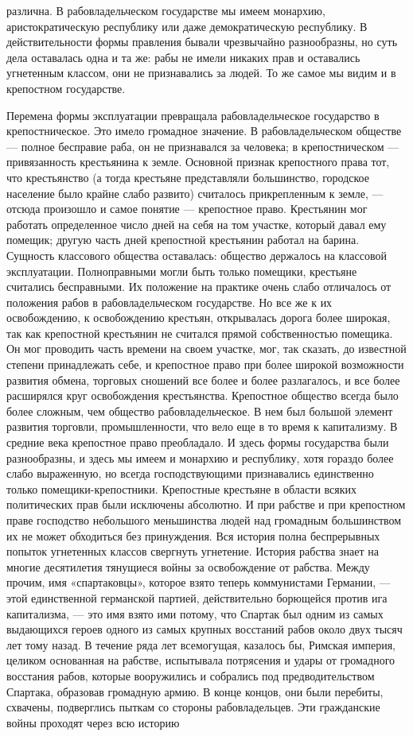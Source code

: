 \documentclass[12pt]{article}
\newcommand{\parnum}{(\arabic{parcount})}
\newcounter{parcount}
\newenvironment{parnumbers}{%
  \par%
  \everypar{\noindent \stepcounter{parcount}\marginpar[]{\parnum}}%
}{}
\begin{document}
\begin{parnumbers}
различна. В рабовладельческом государстве мы имеем монархию, аристократическую республику или даже демократическую республику. В действительности формы правления бывали чрезвычайно разнообразны, но суть дела оставалась одна и та же: рабы не имели никаких прав и оставались угнетенным классом, они не признавались за людей. То же самое мы видим и в крепостном государстве.

Перемена формы эксплуатации превращала рабовладельческое государство в крепостническое. Это имело громадное значение. В рабовладельческом обществе — полное бесправие раба, он не признавался за человека; в крепостническом — привязанность крестьянина к земле. Основной признак крепостного права тот, что крестьянство (а тогда крестьяне представляли большинство, городское население было крайне слабо развито) считалось прикрепленным к земле, — отсюда произошло и самое понятие — крепостное право. Крестьянин мог работать определенное число дней на себя на том участке, который давал ему помещик; другую часть дней крепостной крестьянин работал на барина. Сущность классового общества оставалась: общество держалось на классовой эксплуатации. Полноправными могли быть только помещики, крестьяне считались бесправными. Их положение на практике очень слабо отличалось от положения рабов в рабовладельческом государстве. Но все же к их освобождению, к освобождению крестьян, открывалась дорога более широкая, так как крепостной крестьянин не считался прямой собственностью помещика. Он мог проводить часть времени на своем участке, мог, так сказать, до известной степени принадлежать себе, и крепостное право при более широкой возможности развития обмена, торговых сношений все более и более разлагалось, и все более расширялся круг освобождения крестьянства. Крепостное общество всегда было более сложным, чем общество рабовладельческое. В нем был большой элемент развития торговли, промышленности, что вело еще в то время к капитализму. В средние века крепостное право преобладало. И здесь формы государства были разнообразны, и здесь мы имеем и монархию и республику, хотя гораздо более слабо выраженную, но всегда господствующими признавались единственно только помещики-крепостники. Крепостные крестьяне в области всяких политических прав были исключены абсолютно. И при рабстве и при крепостном праве господство небольшого меньшинства людей над громадным большинством их не может обходиться без принуждения. Вся история полна беспрерывных попыток угнетенных классов свергнуть угнетение. История рабства знает на многие десятилетия тянущиеся войны за освобождение от рабства. Между прочим, имя «спартаковцы», которое взято теперь коммунистами Германии, — этой единственной германской партией, действительно борющейся против ига капитализма, — это имя взято ими потому, что Спартак был одним из самых выдающихся героев одного из самых крупных восстаний рабов около двух тысяч лет тому назад. В течение ряда лет всемогущая, казалось бы, Римская империя, целиком основанная на рабстве, испытывала потрясения и удары от громадного восстания рабов, которые вооружились и собрались под предводительством Спартака, образовав громадную армию. В конце концов, они были перебиты, схвачены, подверглись пыткам со стороны рабовладельцев. Эти гражданские войны проходят через всю историю 
\end{parnumbers}
\end{document}
